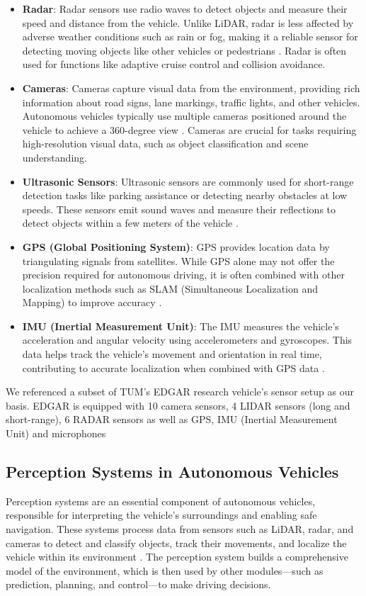 \begin{itemize}
    \item \textbf{Radar}:
    Radar sensors use radio waves to detect objects and measure their speed and distance from the vehicle.
    Unlike LiDAR, radar is less affected by adverse weather conditions such as rain or fog, making it a
    reliable sensor for detecting moving objects like other vehicles or pedestrians \cite{patole2017automotive}.
    Radar is often used for functions like adaptive cruise control and collision avoidance.
    \item \textbf{Cameras}:
    Cameras capture visual data from the environment, providing rich information about road signs,
    lane markings, traffic lights, and other vehicles. Autonomous vehicles typically use multiple cameras positioned
    around the vehicle to achieve a 360-degree view \cite{geiger2012we}. Cameras are crucial for tasks requiring
    high-resolution visual data, such as object classification and scene understanding.
    \item \textbf{Ultrasonic Sensors}:
    Ultrasonic sensors are commonly used for short-range detection tasks like parking assistance or detecting nearby
    obstacles at low speeds. These sensors emit sound waves and measure their reflections to detect objects within
    a few meters of the vehicle \cite{zhang2018ultrasonic}.
    \item \textbf{GPS (Global Positioning System)}:
    GPS provides location data by triangulating signals from satellites. While GPS alone may not offer the precision
    required for autonomous driving, it is often combined with other localization methods such as SLAM
    (Simultaneous Localization and Mapping) to improve accuracy \cite{thrun2005slam}.
    \item \textbf{IMU (Inertial Measurement Unit)}:
    The IMU measures the vehicle's acceleration and angular velocity using accelerometers and gyroscopes.
    This data helps track the vehicle's movement and orientation in real time, contributing to accurate
    localization when combined with GPS data \cite{madgwick2011imu}.
\end{itemize}

We referenced a subset of TUM's EDGAR research vehicle's sensor setup as our basis.
EDGAR is equipped with 10 camera sensors, 4 LIDAR sensors (long and short-range), 6 RADAR sensors as well as GPS, IMU (Inertial Measurement Unit) and microphones \cite{tum2023edgar}

\subsection{Perception Systems in Autonomous Vehicles}
Perception systems are an essential component of autonomous vehicles, responsible for interpreting the
vehicle's surroundings and enabling safe navigation. These systems process data from sensors such as LiDAR,
radar, and cameras to detect and classify objects, track their movements, and localize the vehicle within
its environment \cite{liu2018perception}. The perception system builds a comprehensive model of the environment,
which is then used by other modules—such as prediction, planning, and control—to make driving decisions.

